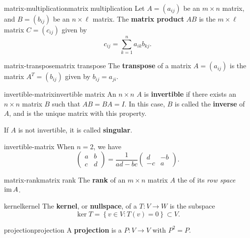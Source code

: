 \begin{topic}{matrix-multiplication}{matrix multiplication}
    Let $A = (a_{ij})$ be an $m \times n$ matrix, and $B = (b_{ij})$ be an $n \times \ell$ matrix. The \textbf{matrix product} $AB$ is the $m \times \ell$ matrix $C = (c_{ij})$ given by
    \[  c_{ij} = \sum_{k = 1}^{n} a_{ik} b_{kj} . \]
\end{topic}

\begin{topic}{matrix-transpose}{matrix transpose}
    The \textbf{transpose} of a matrix $A = (a_{ij})$ is the matrix $A^T = (b_{ij})$ given by $b_{ij} = a_{ji}$.
\end{topic}

\begin{topic}{invertible-matrix}{invertible matrix}
    An $n \times n$  $A$ is \textbf{invertible} if there exists an $n \times n$ matrix $B$ such that $AB = BA = I$. In this case, $B$ is called the \textbf{inverse} of $A$, and is the unique matrix with this property.
    
    If $A$ is not invertible, it is called \textbf{singular}.
\end{topic}

\begin{example}{invertible-matrix}
    When $n = 2$, we have
    \[ \begin{pmatrix} a & b \\ c & d \end{pmatrix} = \frac{1}{ad - bc} \begin{pmatrix} d & -b \\ -c & a \end{pmatrix} . \]
\end{example}

\begin{topic}{matrix-rank}{matrix rank}
    The \textbf{rank} of an $m \times n$ matrix $A$ the  of its \textit{row space} $\operatorname{im} A$.
\end{topic}

\begin{topic}{kernel}{kernel}
    The \textbf{kernel}, or \textbf{nullspace}, of a  $T \colon V \to W$ is the subspace
    \[ \ker T = \left\{ v \in V : T(v) = 0 \right\} \subset V . \]
\end{topic}

\begin{topic}{projection}{projection}
    A \textbf{projection} is a  $P \colon V \to V$ with $P^2 = P$.
\end{topic}


